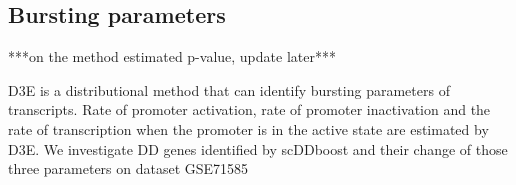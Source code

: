 \documentclass[aoas,preprint]{imsart}
\begin{document}
\subsection{Bursting parameters}

***on the method estimated p-value, update later***

D3E\citep{ref:d3e} is a distributional method that can identify bursting parameters of transcripts. Rate of promoter activation, rate of promoter inactivation and the rate of transcription when the promoter is in the active state are estimated by D3E.  We investigate DD genes identified by scDDboost and their change of those three parameters on dataset GSE71585\\




\end{document}
